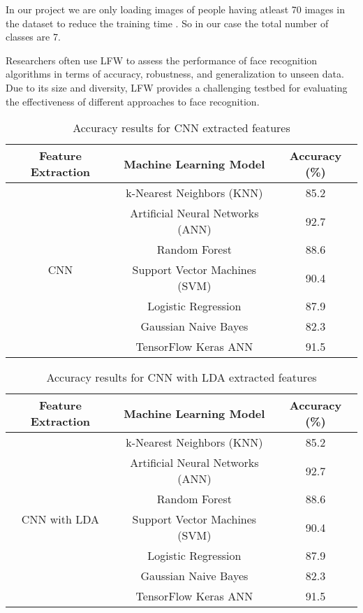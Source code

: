 \documentclass[a4paper]{article}
\theoremstyle{plain}
\theoremstyle{definition}
\begin{document}
In our project we are only loading images of people having atleast 70 images in the dataset to reduce the training time . So in our case the total number of classes are 7.\vspace{8pt} 

Researchers often use LFW to assess the performance of face recognition algorithms in terms of accuracy, robustness, and generalization to unseen data. Due to its size and diversity, LFW provides a challenging testbed for evaluating the effectiveness of different approaches to face recognition.\vspace{8pt}

\begin{table}[htbp]
\centering
\Large %
\caption{Accuracy results for CNN extracted features}
\label{tab:results}
\begin{tabular}{|c|c|c|}
\hline
\textbf{Feature Extraction} & \textbf{Machine Learning Model} & \textbf{Accuracy (\%)} \\ \hline
\multirow{7}{*}{CNN } & k-Nearest Neighbors (KNN) & 85.2 \\ \cline{2-3} 
 & Artificial Neural Networks (ANN) & 92.7 \\ \cline{2-3} 
 & Random Forest & 88.6 \\ \cline{2-3} 
 & Support Vector Machines (SVM) & 90.4 \\ \cline{2-3} 
 & Logistic Regression & 87.9 \\ \cline{2-3} 
 & Gaussian Naive Bayes & 82.3 \\ \cline{2-3} 
 & TensorFlow Keras ANN & 91.5 \\ \hline
\end{tabular}
\end{table}

\begin{table}[htbp]
\centering
\Large
\caption{Accuracy results for CNN with LDA extracted features}
\label{tab:results}
\begin{tabular}{|c|c|c|}
\hline
\textbf{Feature Extraction} & \textbf{Machine Learning Model} & \textbf{Accuracy (\%)} \\ \hline
\multirow{7}{*}{CNN with LDA } & k-Nearest Neighbors (KNN) & 85.2 \\ \cline{2-3} 
 & Artificial Neural Networks (ANN) & 92.7 \\ \cline{2-3} 
 & Random Forest & 88.6 \\ \cline{2-3} 
 & Support Vector Machines (SVM) & 90.4 \\ \cline{2-3} 
 & Logistic Regression & 87.9 \\ \cline{2-3} 
 & Gaussian Naive Bayes & 82.3 \\ \cline{2-3} 
 & TensorFlow Keras ANN & 91.5 \\ \hline
\end{tabular}
\end{table}
\end{document}
